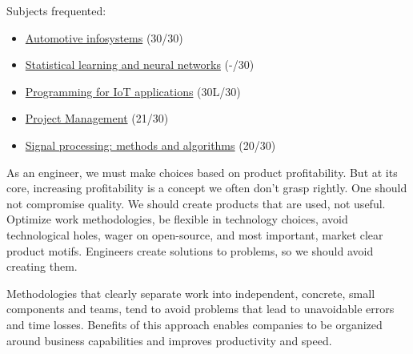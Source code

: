 \documentclass[10pt,a4paper,ragged2e,withhyper]{altacv}
\begin{document}
\begin{paracol}{2}
Subjects frequented:

\small
\begin{itemize}
  \item \href{https://didattica.polito.it/pls/portal30/gap.pkg_guide.viewGap?p_cod_ins=01NIFLO}{Automotive infosystems} (30/30)
  \item \href{https://didattica.polito.it/pls/portal30/gap.pkg_guide.viewGap?p_cod_ins=01SOVBH&p_a_acc=2019&p_header=S}{Statistical learning and neural networks} (-/30)
  \item \href{https://didattica.polito.it/pls/portal30/sviluppo.guide.visualizza?p_cod_ins=01QWRMV&p_a_acc=2018&p_lang=EN}{Programming for IoT applications} (30L/30)
  \item \href{https://didattica.polito.it/pls/portal30/sviluppo.guide.visualizza?p_cod_ins=04IXTPH&p_a_acc=2013}{Project Management} (21/30)
  \item \href{https://didattica.polito.it/pls/portal30/sviluppo.guide.visualizza?p_cod_ins=01QWFBG&p_a_acc=2016&p_lang=EN}{Signal processing: methods and algorithms} (20/30)
\end{itemize}

\divider


\switchcolumn



As an engineer, we must make choices based on product profitability. 
But at its core, increasing profitability is a concept we often don't grasp rightly. 
One should not compromise quality. We should create products that are used, not useful. Optimize work methodologies, be flexible in technology choices, avoid technological holes, wager on open-source, and most important, market clear product motifs.  
Engineers create solutions to problems, so we should avoid creating them.

\iffalse
Methodologies that clearly separate work into independent, concrete, small components and teams, tend to avoid problems that lead to unavoidable errors and time losses. Benefits of this approach enables companies to be organized around business capabilities and improves productivity and speed.


\end{paracol}
\end{document}
